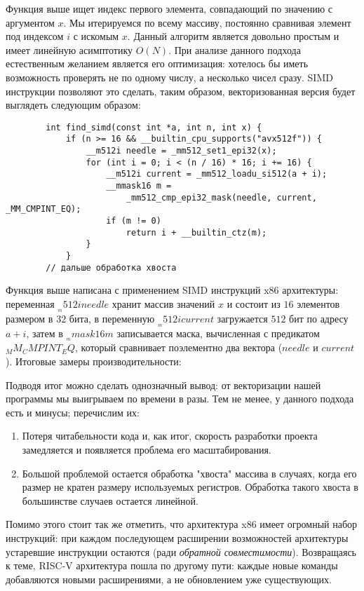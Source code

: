 \documentclass[a4paper, 12pt]{article}
\begin{document}
    Функция выше ищет индекс первого элемента, совпадающий по значению с аргументом $x$. Мы итерируемся
    по всему массиву, постоянно сравнивая элемент под индексом $i$ с искомым $x$. Данный алгоритм является
    довольно простым и имеет линейную асимптотику $O (N)$. При анализе данного подхода естественным желанием
    является его оптимизация: хотелось бы иметь возможность проверять не по одному числу, а несколько чисел
    сразу. SIMD инструкции позволяют это сделать, таким образом, векторизованная версия будет выглядеть
    следующим образом:

    \begin{lstlisting}
        int find_simd(const int *a, int n, int x) {
            if (n >= 16 && __builtin_cpu_supports("avx512f")) {
                __m512i needle = _mm512_set1_epi32(x);
                for (int i = 0; i < (n / 16) * 16; i += 16) {
                    __m512i current = _mm512_loadu_si512(a + i);
                    __mmask16 m =
                        _mm512_cmp_epi32_mask(needle, current, _MM_CMPINT_EQ);
                    if (m != 0)
                        return i + __builtin_ctz(m);
                }
            }
        // дальше обработка хвоста
    \end{lstlisting}

    Функция выше написана с применением SIMD инструкций x86 архитектуры: переменная $__m512i needle$ хранит массив
    значений $x$ и состоит из $16$ элементов размером в $32$ бита, в переменную $__m512i current$ загружается $512$
    бит по адресу $a + i$, затем в $__mmask16 m$ записывается маска, вычисленная с предикатом $_MM_CMPINT_EQ$, который
    сравнивает поэлементно два вектора ($needle$ и $current$). Итоговые замеры производительности:
    
    
    Подводя итог можно сделать однозначный вывод: от векторизации нашей программы мы выигрываем по времени в разы. Тем
    не менее, у данного подхода есть и минусы; перечислим их:

    \begin{enumerate}
        \item Потеря читабельности кода и, как итог, скорость разработки проекта замедляется и появляется проблема его
        масштабирования.
        \item Большой проблемой остается обработка "хвоста" массива в случаях, когда его размер не кратен размеру
        используемых регистров. Обработка такого хвоста в большинстве случаев остается линейной.
    \end{enumerate}

    Помимо этого стоит так же отметить, что архитектура x86 имеет огромный набор инструкций: при каждом последующем
    расширении возможностей архитектуры устаревшие инструкции остаются (ради \textit {обратной совместимости}). Возвращаясь
    к теме, RISC-V архитектура пошла по другому пути: каждые новые команды добавляются новыми расширениями, а не обновлением
    уже существующих.


\end{document}
